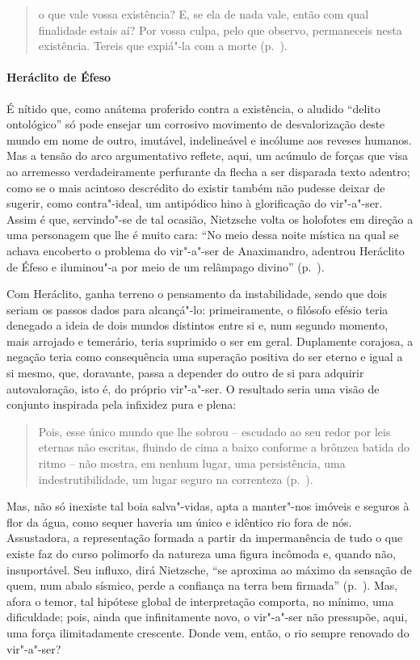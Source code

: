 \begin{quote} 
o que vale vossa existência? E, se ela de nada vale, então
 com qual finalidade estais aí? Por vossa culpa, pelo que observo,
 permaneceis nesta existência. Tereis que expiá"-la com a morte 
 (p.~\pageref{oquevale}).
\end{quote} 

\paragraph{Heráclito de Éfeso} É nítido que, como anátema proferido contra a
 existência, o aludido ``delito ontológico'' só pode ensejar um corrosivo
 movimento de desvalorização deste mundo em nome de outro, imutável,
 indelineável e incólume aos reveses humanos. Mas a tensão do arco
 argumentativo reflete, aqui, um acúmulo de forças que visa ao arremesso
 verdadeiramente perfurante da flecha a ser disparada texto adentro; como se
 o mais acintoso descrédito do existir também não pudesse deixar de sugerir,
 como contra"-ideal, um antipódico hino à glorificação do vir"-a"-ser. Assim
 é que, servindo"-se de tal ocasião, Nietzsche volta os holofotes em direção
 a uma personagem que lhe é muito cara: ``No meio dessa noite mística na qual
 se achava encoberto o problema do vir"-a"-ser de Anaximandro, adentrou
 Heráclito de Éfeso e iluminou"-a por meio de um relâmpago divino''
 (p.~\pageref{noitemistica}).

Com Heráclito, ganha terreno o pensamento da instabilidade, sendo que dois
seriam os passos dados para alcançá"-lo: primeiramente, o filósofo efésio
teria denegado a ideia de dois mundos distintos entre si e, num segundo
momento, mais arrojado e temerário, teria suprimido o ser em geral.
Duplamente corajosa, a negação teria como consequência uma superação positiva
do ser eterno e igual a si mesmo, que, doravante, passa a depender do outro
de si para adquirir autovaloração, isto é, do próprio vir"-a"-ser. O
resultado seria uma visão de conjunto inspirada pela infixidez pura e
plena: 

\begin{quote} 
Pois, esse único mundo que lhe sobrou -- escudado ao seu
 redor por leis eternas não escritas, fluindo de cima a baixo conforme a
 brônzea batida do ritmo -- não mostra, em nenhum lugar, uma persistência,
 uma indestrutibilidade, um lugar seguro na correnteza (p.~\pageref{esseunicomundo}).
\end{quote} 

Mas, não só inexiste tal boia salva"-vidas, apta a manter"-nos imóveis e
seguros à flor da água, como sequer haveria um único e idêntico rio fora de
nós. Assustadora, a representação formada a partir da impermanência de tudo o
que existe faz do curso polimorfo da natureza uma figura incômoda e, quando
não, insuportável. Seu influxo, dirá Nietzsche, ``se aproxima ao máximo da
sensação de quem, num abalo sísmico, perde a confiança na terra bem
firmada'' (p.~\pageref{abalosismico}). Mas, afora o temor, tal hipótese
global de interpretação comporta, no mínimo, uma dificuldade; pois, ainda que
infinitamente novo, o vir"-a"-ser não pressupõe, aqui, uma força
ilimitadamente crescente. Donde vem, então, o rio sempre renovado do
vir"-a"-ser? 

